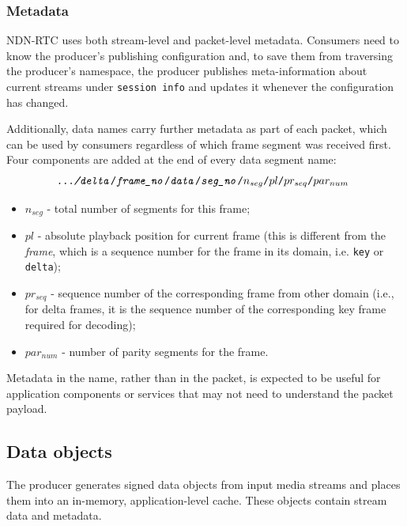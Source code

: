 \documentclass{icn/sig-alternate-2013} %
\newcommand{\ndnrtcName}{NDN-RTC} %
\begin{document}
\subsubsection{Metadata} 

\ndnrtcName{} uses both stream-level and packet-level metadata. 
Consumers need to know the producer's publishing configuration and, to save them from traversing the producer's namespace, the producer publishes meta-information about current streams under \texttt{session info} and updates it whenever the configuration has changed.

Additionally, data names carry further metadata as part of each packet, which can be used by consumers regardless of which frame segment was received first. 
Four components are added at the end of every data segment name:
\small\begin{equation}
\texttt{\textit{.../delta}/\textit{frame\_no}/\textit{data}/\textit{seg\_no}/\textbf{$n_{seg}$}/\textbf{$pl$}/\textbf{$pr_{seq}$}/\textbf{$par_{num}$} \nonumber}
\end{equation}\normalsize
\begin{itemize}[label={}]
\item \texttt{$n_{seg}$} - total number of segments for this frame;
\item \texttt{$pl$} - absolute playback position for current frame (this is different from the \textit{frame}, which is a sequence number for the frame in its domain, i.e. \texttt{key} or \texttt{delta});
\item \texttt{$pr_{seq}$} - sequence number of the corresponding frame from other domain (i.e., for delta frames, it is the sequence number of the corresponding key frame required for decoding);
\item \texttt{$par_{num}$} - number of parity segments for the frame.
\end{itemize}
Metadata in the name, rather than in the packet, is expected to be useful for application components or services that may not need to understand the packet payload. 

\subsection{Data objects}
The producer generates signed data objects from input media streams and places them into an in-memory, application-level cache.  These objects contain stream data and metadata.
\end{document}
